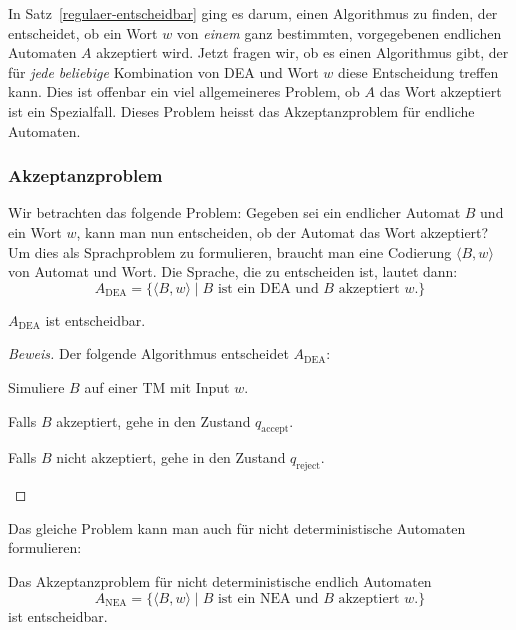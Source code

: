 In Satz~\ref{regulaer-entscheidbar} ging es darum, einen Algorithmus
zu finden, der entscheidet, ob ein Wort $w$ von {\em einem} ganz bestimmten,
vorgegebenen endlichen Automaten $A$ akzeptiert wird.
Jetzt fragen wir, ob es einen Algorithmus gibt, der für {\em jede beliebige}
Kombination von DEA und Wort $w$ diese Entscheidung treffen kann.
Dies ist offenbar ein viel allgemeineres Problem, ob $A$ das Wort
akzeptiert ist ein Spezialfall.
Dieses Problem heisst das
Akzeptanzproblem für endliche Automaten.

\subsubsection{Akzeptanzproblem}
%
Wir betrachten das folgende Problem: Gegeben sei ein endlicher Automat $B$
und ein Wort $w$,
kann man nun entscheiden, ob der Automat das Wort akzeptiert?
Um dies als Sprachproblem zu formulieren, braucht  man eine Codierung
$\langle B,w\rangle$ von Automat und Wort.
Die Sprache, die zu
entscheiden ist, lautet dann:
\[
A_{\text{DEA}} =\{
\langle B,w\rangle\;|\;\text{$B$ ist ein DEA und $B$ akzeptiert $w$}.
\}
\]
%
\begin{satz}
\label{adea_decidable}
$A_{\text{DEA}}$ ist entscheidbar.
\end{satz}
%

\begin{proof}[Beweis]
Der folgende Algorithmus entscheidet
$A_{\text{DEA}}$:
\medskip
\begin{compactenum}
\item Simuliere $B$ auf einer TM mit Input $w$.
\item Falls $B$ akzeptiert, gehe in den Zustand $q_{\text{accept}}$.
\item Falls $B$ nicht akzeptiert, gehe in den Zustand $q_{\text{reject}}$.
\end{compactenum}
\medskip
\end{proof}

Das gleiche Problem kann man auch für nicht deterministische Automaten
formulieren:

\begin{satz}
%
Das Akzeptanzproblem für nicht deterministische endlich Automaten
\[
A_{\text{NEA}} =\{
\langle B,w\rangle\;|\;\text{$B$ ist ein NEA und $B$ akzeptiert $w$}.
\}
\]
%
ist entscheidbar.
\end{satz}

